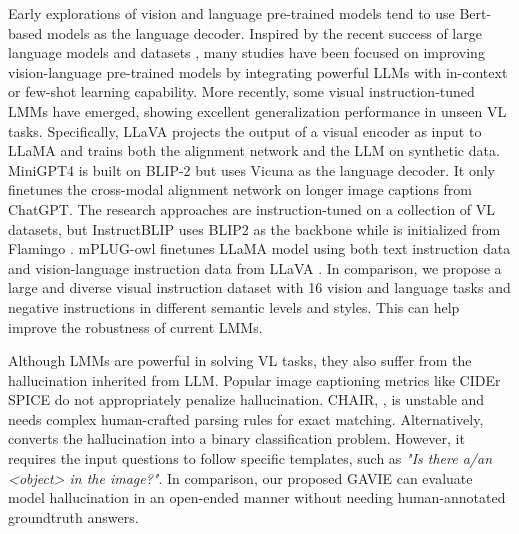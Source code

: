 Early explorations \citep{wang2022git, li2022blip,li2019visualbert, sun2019videobert} of vision and language pre-trained models tend to use Bert-based \citep{liu2019roberta, koroteev2021bert} models as the language decoder. Inspired by the recent success of large language models \citep{touvron2023llama, gilardi2023chatgpt, zhao2023survey} and datasets \citep{lin2014microsoft, changpinyo2021conceptual, krishna2017visual, liu2020visual, sharma2018conceptual, srinivasan2021wit, liu2023documentclip}, many studies \citep{alayrac2022flamingo, li2023blip, li2023otter} have been focused on improving vision-language pre-trained models by integrating powerful LLMs with in-context or few-shot learning capability. More recently, some visual instruction-tuned LMMs \citep{zhu2023minigpt, liu2023visual, gong2023multimodal, dai2023instructblip} have emerged, showing excellent generalization performance in unseen VL tasks. Specifically, LLaVA \citep{liu2023visual} projects the output of a visual encoder as input to LLaMA \citep{touvron2023llama} and trains both the alignment network and the LLM on synthetic data. MiniGPT4 \citep{zhu2023minigpt} is built on BLIP-2 but uses Vicuna \citep{chiang2023vicuna} as the language decoder. It only finetunes the cross-modal alignment network on longer image captions from ChatGPT. The research approaches \citep{gong2023multimodal, dai2023instructblip} are instruction-tuned on a collection of VL datasets, but InstructBLIP \citep{dai2023instructblip} uses BLIP2 \citep{li2023blip} as the backbone while \citep{gong2023multimodal} is initialized from Flamingo \citep{alayrac2022flamingo}. mPLUG-owl \citep{ye2023mplug} finetunes LLaMA \citep{touvron2023llama} model using both text instruction data and vision-language instruction data from LLaVA \citep{liu2023visual}. In comparison, we propose a large and diverse visual instruction dataset with 16 vision and language tasks and negative instructions in different semantic levels and styles. This can help improve the robustness of current LMMs.

Although LMMs are powerful in solving VL tasks, they also suffer from the hallucination  inherited from LLM. Popular image captioning metrics like CIDEr \citep{vedantam2015cider} SPICE \citep{anderson2016spice} do not appropriately penalize hallucination. CHAIR, \citep{rohrbach2018object}, is unstable and needs complex human-crafted parsing rules for exact matching. Alternatively, \citep{li2023evaluating} converts the hallucination into a binary classification problem. However, it requires the input questions to follow specific templates, such as \textit{"Is there a/an <object> in the image?"}. In comparison, our proposed GAVIE  can evaluate model hallucination in an  open-ended manner without needing human-annotated groundtruth answers.


